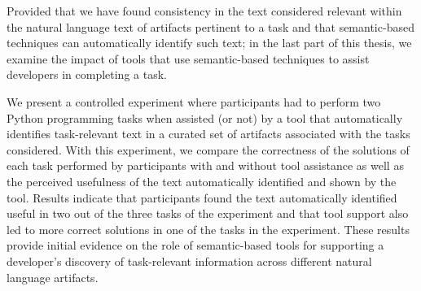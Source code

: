 Provided that we have found consistency in the text considered relevant within the natural language text of artifacts pertinent to a task and that semantic-based techniques can automatically identify such text; in the last part of this thesis, we examine the impact of tools that use semantic-based techniques to assist developers in 
completing a task. 



We present a controlled experiment where participants had to 
perform two Python programming tasks when assisted (or not) by a tool that automatically identifies task-relevant text 
in a curated set of artifacts associated with the tasks considered. 
With this experiment, we compare the correctness of the solutions of each task 
performed by participants with and without tool assistance
as well as the perceived usefulness of the text automatically identified and shown by the tool. 
Results indicate that participants found the text automatically identified
useful in two out of the three tasks of the experiment
and that tool support also led to more correct solutions 
in one of the tasks in the experiment. These results provide
initial evidence on the role of semantic-based tools 
for supporting a developer's discovery of task-relevant information
across different natural language artifacts.









